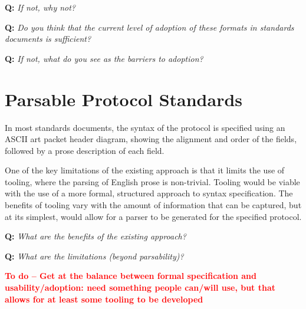 \documentclass[10pt]{article}
\newcommand{\todo}[1]{\textbf{\textcolor{red}{To do -- #1}}}
\newcommand{\question}[1]{\vspace{4mm}\noindent\textbf{Q:} \textit{#1}}
\begin{document}
\question{If not, why not?}

\question{Do you think that the current level of adoption of these formats in standards documents is sufficient?}

\question{If not, what do you see as the barriers to adoption?}

\section{Parsable Protocol Standards}

In most standards documents, the syntax of the protocol is specified using an ASCII art
packet header diagram, showing the alignment and order of the fields, followed by a prose
description of each field.

One of the key limitations of the existing approach is that it limits the use of tooling,
where the parsing of English prose is non-trivial. Tooling would be viable with the use of
a more formal, structured approach to syntax specification. The benefits of tooling vary
with the amount of information that can be captured, but at its simplest, would allow for
a parser to be generated for the specified protocol. 

\question{What are the benefits of the existing approach?}

\question{What are the limitations (beyond parsability)?}

\todo{Get at the balance between formal specification and usability/adoption: need something
people can/will use, but that allows for at least some tooling to be developed}



\end{document}
